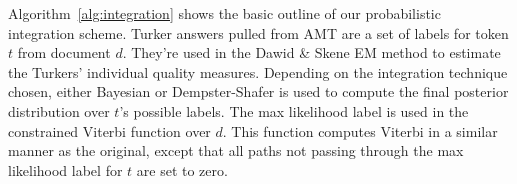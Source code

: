 Algorithm~\ref{alg:integration} shows the basic outline of our probabilistic integration scheme.  Turker answers pulled from AMT are a set of labels for token $t$ from document $d$.  They're used in the Dawid \& Skene EM method to estimate the Turkers' individual quality measures.  Depending on the integration technique chosen, either Bayesian or Dempster-Shafer is used to compute the final posterior distribution over $t$'s possible labels.  The max likelihood label is used in the constrained Viterbi function over $d$.  This function computes Viterbi in a similar manner as the original, except that all paths not passing through the max likelihood label for $t$ are set to zero.

